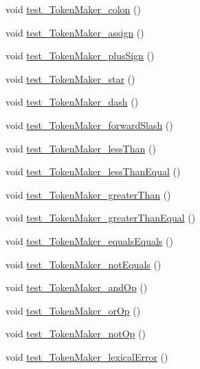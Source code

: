 \begin{DoxyCompactItemize}
\item 
void \hyperlink{classScannerTestSuite_af98d5f5c61439723d0cb18f9357d91d8}{test\-\_\-\-Token\-Maker\-\_\-colon} ()
\item 
void \hyperlink{classScannerTestSuite_aa04a5770dba31012dd42409eebbf0eb8}{test\-\_\-\-Token\-Maker\-\_\-assign} ()
\item 
void \hyperlink{classScannerTestSuite_ad65fde16b4a37ce6686bbc29b0e42f07}{test\-\_\-\-Token\-Maker\-\_\-plus\-Sign} ()
\item 
void \hyperlink{classScannerTestSuite_af0977bb3ca5ca5954bc787c31b041649}{test\-\_\-\-Token\-Maker\-\_\-star} ()
\item 
void \hyperlink{classScannerTestSuite_a348c6d799fb438215ee94891328f95eb}{test\-\_\-\-Token\-Maker\-\_\-dash} ()
\item 
void \hyperlink{classScannerTestSuite_a25f1d1c73ad5b607613a34bd5d5c3238}{test\-\_\-\-Token\-Maker\-\_\-forward\-Slash} ()
\item 
void \hyperlink{classScannerTestSuite_afc7124c00488adc7635905290e1159e6}{test\-\_\-\-Token\-Maker\-\_\-less\-Than} ()
\item 
void \hyperlink{classScannerTestSuite_a2b2720fe2932b4db758df6c67e1bef14}{test\-\_\-\-Token\-Maker\-\_\-less\-Than\-Equal} ()
\item 
void \hyperlink{classScannerTestSuite_a2d3ebde4e350cb1ee4ee8c53c54bf0a0}{test\-\_\-\-Token\-Maker\-\_\-greater\-Than} ()
\item 
void \hyperlink{classScannerTestSuite_a9805d181580e4b7fafa00b0beaf53a32}{test\-\_\-\-Token\-Maker\-\_\-greater\-Than\-Equal} ()
\item 
void \hyperlink{classScannerTestSuite_a809cfddc66a88d434e6b57bff9737a01}{test\-\_\-\-Token\-Maker\-\_\-equals\-Equals} ()
\item 
void \hyperlink{classScannerTestSuite_a9ee2f76c0deeb7b0c99d1be5d895c46f}{test\-\_\-\-Token\-Maker\-\_\-not\-Equals} ()
\item 
void \hyperlink{classScannerTestSuite_aa71ec0de76c1afa02ff6468f60fc188f}{test\-\_\-\-Token\-Maker\-\_\-and\-Op} ()
\item 
void \hyperlink{classScannerTestSuite_a79743fed40c2a7e325dab1804c6a863b}{test\-\_\-\-Token\-Maker\-\_\-or\-Op} ()
\item 
void \hyperlink{classScannerTestSuite_ade8c573d5c330cdedca37d3dc61220a7}{test\-\_\-\-Token\-Maker\-\_\-not\-Op} ()
\item 
void \hyperlink{classScannerTestSuite_a1da1492cbad92364e2ce1e26e9941fb2}{test\-\_\-\-Token\-Maker\-\_\-lexical\-Error} ()

\end{DoxyCompactItemize}
